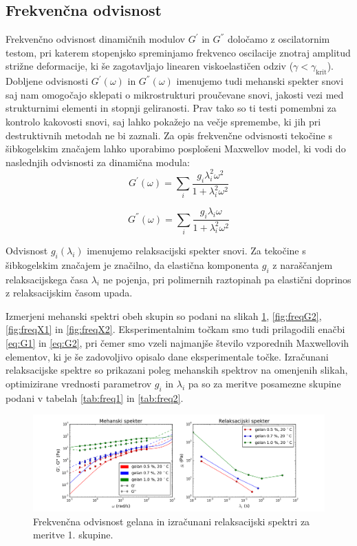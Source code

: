 \documentclass{article}
\begin{document}
\subsection{Frekvenčna odvisnost}

Frekvenčno odvisnost dinamičnih modulov $G^{'}$ in $G^{''}$ določamo z oscilatornim testom, pri katerem stopenjsko spreminjamo frekvenco oscilacije znotraj amplitud strižne deformacije, ki še zagotavljajo linearen viskoelastičen odziv ($\gamma < \gamma_\mathrm{krit}$). Dobljene odvisnosti $G^{'}(\omega)$ in $G^{''}(\omega)$ imenujemo tudi mehanski spekter snovi saj nam omogočajo sklepati o mikrostrukturi proučevane snovi, jakosti vezi med strukturnimi elementi in stopnji geliranosti. Prav tako so ti testi pomembni za kontrolo kakovosti snovi, saj lahko pokažejo na večje spremembe, ki jih pri destruktivnih metodah ne bi zaznali.
Za opis frekvenčne odvisnosti tekočine s šibkogelskim značajem lahko uporabimo posplošeni Maxwellov model, ki vodi do naslednjih odvisnosti za dinamična modula:
\begin{equation} \label{eq:G1}
G^{'}(\omega) = \sum\limits_{i} \frac{g_i \lambda_i^2 \omega^2}{1 + \lambda_i^2 \omega^2}
\end{equation}

\begin{equation} \label{eq:G2}
G^{''}(\omega) = \sum\limits_{i} \frac{g_i \lambda_i \omega}{1 + \lambda_i^2 \omega^2}
\end{equation}

Odvisnost $g_i(\lambda_i)$ imenujemo relaksacijski spekter snovi. Za tekočine s šibkogelskim značajem je značilno, da elastična komponenta $g_i$ z naraščanjem relaksacijskega časa $\lambda_i$ ne pojenja, pri polimernih raztopinah pa elastični doprinos z relaksacijskim časom upada.

Izmerjeni mehanski spektri obeh skupin so podani na slikah \ref{fig:freqG1}, \ref{fig:freqG2}, \ref{fig:freqX1} in \ref{fig:freqX2}. Eksperimentalnim točkam smo tudi prilagodili enačbi \ref{eq:G1} in \ref{eq:G2}, pri čemer smo vzeli najmanjše število vzporednih Maxwellovih elementov, ki je še zadovoljivo opisalo dane eksperimentale točke. Izračunani relaksacijske spektre so prikazani poleg mehanskih spektrov na omenjenih slikah, optimizirane vrednosti parametrov $g_i$ in $\lambda_i$ pa so za meritve posamezne skupine podani v tabelah \ref{tab:freq1} in \ref{tab:freq2}.

\begin{figure}
  \centering
  \includegraphics[width=\linewidth]{S1_gelan.png}
  \caption{Frekvenčna odvisnost gelana in izračunani relaksacijski spektri za meritve 1. skupine.}
  \label{fig:freqG1}
\end{figure}
\end{document}

